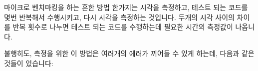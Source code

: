마이크로 벤치마킹을 하는 흔한 방법 한가지는 시각을 측정하고, 테스트 되는 코드를
몇번 반복해서 수행시키고, 다시 시각을 측정하는 것입니다.
두개의 시각 사이의 차이를 반복 횟수로 나누면 테스트 되는 코드를 수행하는데
필요한 시간의 측정값이 나옵니다.

불행히도, 측정을 위한 이 방법은 여러개의 에러가 끼어들 수 있게 하는데, 다음과
같은 것들이 있습니다:

